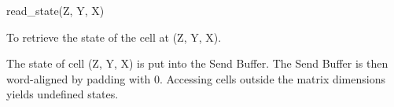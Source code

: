 

\format
read\_state(Z, Y, X)

\purpose

To retrieve the state of the cell at (Z, Y, X).

\description

The state of cell (Z, Y, X) is put into the Send Buffer.
The Send Buffer is then word-aligned by padding with 0.
Accessing cells outside the matrix dimensions yields undefined states.
